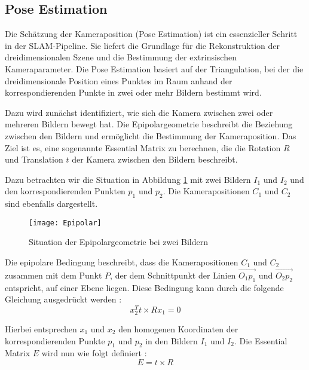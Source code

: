 \subsection{Pose Estimation}

Die Schätzung der Kameraposition (Pose Estimation) ist ein essenzieller Schritt in der SLAM-Pipeline. Sie liefert die Grundlage für die Rekonstruktion der dreidimensionalen Szene und die Bestimmung der extrinsischen Kameraparameter. Die Pose Estimation basiert auf der Triangulation, bei der die dreidimensionale Position eines Punktes im Raum anhand der korrespondierenden Punkte in zwei oder mehr Bildern bestimmt wird. \cite{gao2021vSLAM}

Dazu wird zunächst identifiziert, wie sich die Kamera zwischen zwei oder mehreren Bildern bewegt hat. Die Epipolargeometrie beschreibt die Beziehung zwischen den Bildern und ermöglicht die Bestimmung der Kameraposition.  Das Ziel ist es, eine sogenannte Essential Matrix zu berechnen, die die Rotation \( R \) und Translation \( t \) der Kamera zwischen den Bildern beschreibt. \cite{gao2021vSLAM}

Dazu betrachten wir die Situation in Abbildung \ref{fig:Epipolar} mit zwei Bildern \( I_1 \) und \( I_2 \) und den korrespondierenden Punkten \( p_1 \) und \( p_2 \). Die Kamerapositionen \( C_1 \) und \( C_2 \) sind ebenfalls dargestellt. \cite{gao2021vSLAM}

\begin{figure}
    \centering
    \texttt{[image: Epipolar]}
    \caption{Situation der Epipolargeometrie bei zwei Bildern\label{fig:Epipolar}}\par
\end{figure}

Die epipolare Bedingung beschreibt, dass die Kamerapositionen \( C_1 \) und \( C_2 \) zusammen mit dem Punkt \( P \), der dem Schnittpunkt der Linien \( \overrightarrow{O_1p_1} \) und \( \overrightarrow{O_2p_2} \) entspricht, auf einer Ebene liegen. Diese Bedingung kann durch die folgende Gleichung ausgedrückt werden \cite{gao2021vSLAM}:
\begin{equation}
    x_2^T t \times R x_1 = 0
\end{equation}

Hierbei entsprechen \( x_1 \) und \( x_2 \) den homogenen Koordinaten der korrespondierenden Punkte \( p_1 \) und \( p_2 \) in den Bildern \( I_1 \) und \( I_2 \). Die Essential Matrix \( E \) wird nun wie folgt definiert \cite{gao2021vSLAM}:
\begin{equation}
    E = t \times R
\end{equation}

